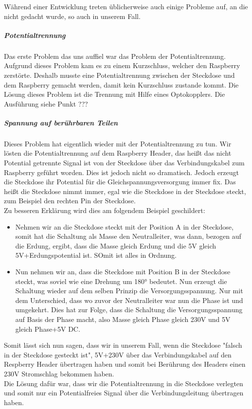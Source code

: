 Während einer Entwicklung treten üblicherweise auch einige Probleme auf, an die nicht gedacht wurde, so auch in unserem Fall.\\
\subparagraph{Potentialtrennung}
Das erste Problem das uns auffiel war das Problem der Potentialtrennung. Aufgrund dieses Problem kam es zu einem Kurzschluss, welcher den Raspberry zerstörte. Deshalb musste eine Potentialtrennung zwischen der Steckdose und dem Raspberry gemacht werden, damit kein Kurzschluss zustande kommt. Die Lösung dieses Problem ist die Trennung mit Hilfe eines Optokopplers. Die Ausführung siehe Punkt ??? \\
\subparagraph{Spannung auf berührbaren Teilen}
Dieses Problem hat eigentlich wieder mit der Potentialtrennung zu tun. Wir lösten die Potentialtrennung auf dem Raspberry Header, das heißt das nicht Potential getrennte Signal ist von der Steckdose über das Verbindungskabel zum Raspberry geführt worden. Dies ist jedoch nicht so dramatisch. Jedoch erzeugt die Steckdose ihr Potential für die Gleichspannungsversorgung immer fix. Das heißt die Steckdose nimmt immer, egal wie die Steckdose in der Steckdose steckt, zum Beispiel den rechten Pin der Steckdose.\\
Zu besseren Erklärung wird dies am folgendem Beispiel geschildert:\\
\begin{itemize}
	\item Nehmen wir an die Steckdose steckt mit der Position A in der Steckdose, somit hat die Schaltung als Masse den Neutralleiter, was dann, bezogen auf die Erdung, ergibt, dass die Masse gleich Erdung und die  5V gleich 5V+Erdungspotential ist. SOmit ist alles in Ordnung.
	\item Nun nehmen wir an, dass die Steckdose mit Position B in der Steckdose steckt, was soviel wie eine Drehung um 180° bedeutet. Nun erzeugt die Schaltung wieder auf dem selben Prinzip die Versorgungsspannung. Nur mit dem Unterschied, dass wo zuvor der Neutralleiter war nun die Phase ist und umgekehrt. Dies hat zur Folge, dass die Schaltung die Versorgungsspannung auf Basis der Phase macht, also Masse gleich Phase gleich 230V und 5V gleich Phase+5V DC.
\end{itemize}
Somit lässt sich nun sagen, dass wir in unserem Fall, wenn die Steckdose "falsch in der Steckdose gesteckt ist", 5V+230V über das Verbindungskabel auf den Respberry Header übertragen haben und somit bei Berührung des Headers einen 230V Stromschlag bekommen haben.\\
Die Lösung dafür war, dass wir die Potentialtrennung in die Steckdose verlegten und somit nur ein Potentialfreies Signal über die Verbindungsleitung übertragen haben.